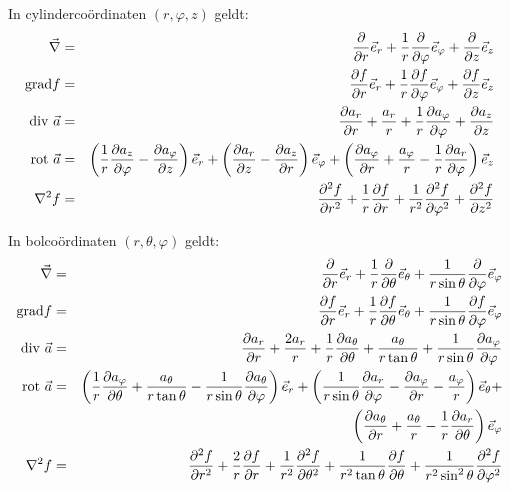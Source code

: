 In cylinderco\"ordinaten $(r,\varphi,z)$ geldt:
\begin{eqnarray*}
\vec{\nabla}     &=&\Q{}{r}\ee{r}+\frac{1}{r}\Q{}{\varphi}\ee{\varphi}+\Q{}{z}\ee{z}\\
{\rm grad}f      &=&\Q{f}{r}\ee{r}+\frac{1}{r}\Q{f}{\varphi}\ee{\varphi}+\Q{f}{z}\ee{z}\\
{\rm div}~\vec{a}&=&\Q{a_r}{r}+\frac{a_r}{r}+\frac{1}{r}\Q{a_\varphi}{\varphi}+\Q{a_z}{z}\\
{\rm rot}~\vec{a}&=&\left(\frac{1}{r}\Q{a_z}{\varphi}-\Q{a_\varphi}{z}\right)\ee{r}+
                    \left(\Q{a_r}{z}-\Q{a_z}{r}\right)\ee{\varphi}+
                    \left(\Q{a_\varphi}{r}+\frac{a_\varphi}{r}-\frac{1}{r}\Q{a_r}{\varphi}\right)\ee{z}\\
\nabla^2 f       &=&\QQ{f}{r}+\frac{1}{r}\Q{f}{r}+\frac{1}{r^2}\QQ{f}{\varphi}+\QQ{f}{z}
\end{eqnarray*}

In bolco\"ordinaten $(r,\theta,\varphi)$ geldt:
\begin{eqnarray*}
\vec{\nabla}     &=&\Q{}{r}\ee{r}+\frac{1}{r}\Q{}{\theta}\ee{\theta}+\frac{1}{r\sin\theta}\Q{}{\varphi}\ee{\varphi}\\
{\rm grad}f      &=&\Q{f}{r}\ee{r}+\frac{1}{r}\Q{f}{\theta}\ee{\theta}+\frac{1}{r\sin\theta}\Q{f}{\varphi}\ee{\varphi}\\
{\rm div}~\vec{a}&=&\Q{a_r}{r}+\frac{2a_r}{r}+\frac{1}{r}\Q{a_\theta}{\theta}+\frac{a_\theta}{r\tan\theta}+\frac{1}{r\sin\theta}\Q{a_\varphi}{\varphi}\\
{\rm rot}~\vec{a}&=&\left(\frac{1}{r}\Q{a_\varphi}{\theta}+\frac{a_\theta}{r\tan\theta}-\frac{1}{r\sin\theta}\Q{a_\theta}{\varphi}\right)\ee{r}+
                    \left(\frac{1}{r\sin\theta}\Q{a_r}{\varphi}-\Q{a_\varphi}{r}-\frac{a_\varphi}{r}\right)\ee{\theta}+\\
                 &&\left(\Q{a_\theta}{r}+\frac{a_\theta}{r}-\frac{1}{r}\Q{a_r}{\theta}\right)\ee{\varphi}\\
\nabla^2 f       &=&\QQ{f}{r}+\frac{2}{r}\Q{f}{r}+\frac{1}{r^2}\QQ{f}{\theta}+\frac{1}{r^2\tan\theta}\Q{f}{\theta}+\frac{1}{r^2\sin^2\theta}\QQ{f}{\varphi}
\end{eqnarray*}

